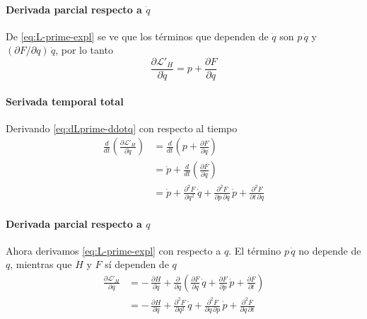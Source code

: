 \documentclass{article}
\begin{document}
\paragraph{Derivada parcial respecto a $\dot q$}

De \eqref{eq:L-prime-expl} se ve que los términos que dependen de $\dot q$ son
$p\,\dot q$ y $(\partial F/\partial q)\,\dot q$, por lo tanto
\begin{equation}
  \frac{\partial \mathcal{L}'_{H}}{\partial \dot q}
  = p + \frac{\partial F}{\partial q}
  \label{eq:dLprime-ddotq}
\end{equation}

\paragraph{Serivada temporal total}

Derivando \eqref{eq:dLprime-ddotq} con respecto al tiempo
\begin{equation}
\begin{split}
  \frac{d}{dt}
  \left(
    \frac{\partial \mathcal{L}'_{H}}{\partial \dot q}
  \right)
  &=
  \frac{d}{dt}
  \left(
    p + \frac{\partial F}{\partial q}
  \right)
  \\
  &=
  \dot p
  + \frac{d}{dt}\left(\frac{\partial F}{\partial q}\right)
  \\
  &=
  \dot p
  + \frac{\partial^{2}F}{\partial q^{2}}\,\dot q
  + \frac{\partial^{2}F}{\partial p\,\partial q}\,\dot p
  + \frac{\partial^{2}F}{\partial t\,\partial q}
\end{split}
\label{eq:d-dt-dLprime-ddotq}
\end{equation}

\paragraph{Derivada parcial respecto a $q$}

Ahora derivamos \eqref{eq:L-prime-expl} con respecto a $q$.  
El término $p\,\dot q$ no depende de $q$, mientras que $H$ y $F$ sí dependen
de $q$
\begin{equation}
\begin{split}
  \frac{\partial \mathcal{L}'_{H}}{\partial q}
  &=
  -\,\frac{\partial H}{\partial q}
  +
  \frac{\partial}{\partial q}
  \left(
    \frac{\partial F}{\partial q}\,\dot q
    + \frac{\partial F}{\partial p}\,\dot p
    + \frac{\partial F}{\partial t}
  \right)
  \\
  &=
  -\,\frac{\partial H}{\partial q}
  + \frac{\partial^{2}F}{\partial q^{2}}\,\dot q
  + \frac{\partial^{2}F}{\partial q\,\partial p}\,\dot p
  + \frac{\partial^{2}F}{\partial q\,\partial t}
\end{split}
\label{eq:dLprime-dq}
\end{equation}
\end{document}
